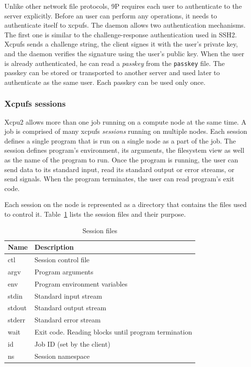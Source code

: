 \documentclass[10pt,conference,letterpaper]{IEEEtran}
\begin{document}
Unlike other network file protocols, 9P requires each user to authenticate
to the server explicitly. Before an user can perform any operations, it
needs to authenticate itself to xcpufs. The daemon allows two authentication
mechanisms. The first one is similar to the challenge-response
authentication used in SSH2. Xcpufs sends a challenge string, the client
signes it with the user's private key, and the daemon verifies the signature
using the user's public key. When the user is already authenticated, he can
read a \textsl{passkey} from the \texttt{passkey} file. The passkey can be
stored or transported to another server and used later to authenticate as
the same user. Each passkey can be used only once.

\subsubsection{Xcpufs sessions}

Xcpu2 allows more than one job running on a compute node at the same time. A
job is comprised of many xcpufs \textsl{sessions} running on multiple
nodes. Each session defines a single program that is run on a single node as
a part of the job. The session defines program's environment, its arguments,
the filesystem view as well as the name of the program to run. Once the
program is running, the user can send data to its standard input, read its
standard output or error streams, or send signals. When the program
terminates, the user can read program's exit code.

Each session on the node is represented as a directory that contains the
files used to control it. Table~\ref{tbl:xcpu2-session} lists the session
files and their purpose.

\begin{table}[ht]
\begin{center}
\begin{tabular}{lp{2.4in}}
    Name & Description\\
    \hline
    \ttfamily ctl & Session control file\\
    \ttfamily argv & Program arguments\\
    \ttfamily env & Program environment variables\\
    \ttfamily stdin & Standard input stream\\
    \ttfamily stdout & Standard output stream\\
    \ttfamily stderr & Standard error stream\\
    \ttfamily wait & Exit code. Reading blocks until program termination\\
    \ttfamily id & Job ID (set by the client)\\
    \ttfamily ns & Session namespace\\
\end{tabular}
\caption{Session files}
\label{tbl:xcpu2-session}
\end{center}
\end{table}
\end{document}
